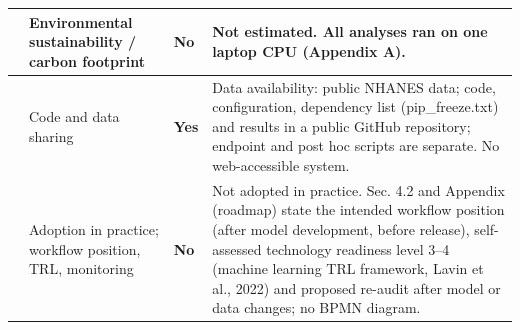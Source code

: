 \documentclass[9pt]{extarticle}
\begin{document}
\begin{longtable}{>{\raggedright\arraybackslash}p{1.0cm}>{\raggedright\arraybackslash}p{7.2cm}>{\centering\arraybackslash}p{1.4cm}>{\raggedright\arraybackslash}p{14.6cm}}
28 & Environmental sustainability / carbon footprint & \textbf{No} & Not estimated. All analyses ran on one laptop CPU (Appendix A).\\ \midrule
29 & Code and data sharing & \textbf{Yes} & Data availability: public NHANES data; code, configuration, dependency list (pip\_freeze.txt) and results in a public GitHub repository; endpoint and post hoc scripts are separate. No web-accessible system.\\ \midrule
30 & Adoption in practice; workflow position, TRL, monitoring & \textbf{No} & Not adopted in practice. Sec. 4.2 and Appendix (roadmap) state the intended workflow position (after model development, before release), self-assessed technology readiness level 3--4 (machine learning TRL framework, Lavin et al., 2022) and proposed re-audit after model or data changes; no BPMN diagram.\\ \midrule
\end{longtable}
\end{document}
